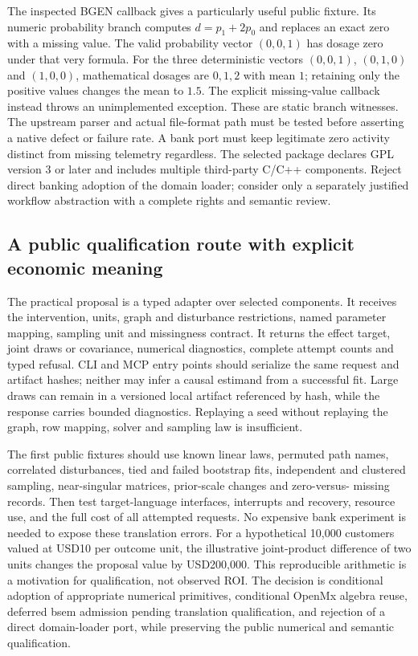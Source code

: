 The inspected BGEN callback gives a particularly useful public fixture. Its
numeric probability branch computes $d=p_1+2p_0$ and replaces an exact zero
with a missing value. The valid probability vector $(0,0,1)$ has dosage zero
under that very formula. For the three deterministic vectors $(0,0,1)$,
$(0,1,0)$ and $(1,0,0)$, mathematical dosages are $0,1,2$ with mean $1$;
retaining only the positive values changes the mean to $1.5$. The explicit
missing-value callback instead throws an unimplemented exception. These are
static branch witnesses. The upstream parser and actual file-format path must
be tested before asserting a native defect or failure rate. A bank port must
keep legitimate zero activity distinct from missing telemetry regardless.
The selected package declares GPL version 3 or later and includes multiple
third-party C/C++ components. Reject direct banking adoption of the domain
loader; consider only a separately justified workflow abstraction with a
complete rights and semantic review.\citep{exec25_cmed_gwsem,exec25_cmed_choice}

\subsection{A public qualification route with explicit economic meaning}

The practical proposal is a typed adapter over selected components. It receives
the intervention, units, graph and disturbance restrictions, named parameter
mapping, sampling unit and missingness contract. It returns the effect target,
joint draws or covariance, numerical diagnostics, complete attempt counts and
typed refusal. CLI and MCP entry points should serialize the same request and
artifact hashes; neither may infer a causal estimand from a successful fit.
Large draws can remain in a versioned local artifact referenced by hash, while
the response carries bounded diagnostics. Replaying a seed without replaying
the graph, row mapping, solver and sampling law is insufficient.

The first public fixtures should use known linear laws, permuted path names,
correlated disturbances, tied and failed bootstrap fits, independent and
clustered sampling, near-singular matrices, prior-scale changes and zero-versus-
missing records. Then test target-language interfaces, interrupts and recovery,
resource use, and the full cost of all attempted requests. No expensive bank
experiment is needed to expose these translation errors. For a hypothetical
10,000 customers valued at USD10 per outcome unit, the illustrative joint-product
difference of two units changes the proposal value by USD200,000. This
reproducible arithmetic is a motivation for qualification, not observed ROI.
The decision is conditional adoption of appropriate numerical primitives,
conditional OpenMx algebra reuse, deferred bsem admission pending translation
qualification, and rejection of a direct domain-loader port, while preserving
the public numerical and semantic qualification.\citep{exec25_cmed_choice}
